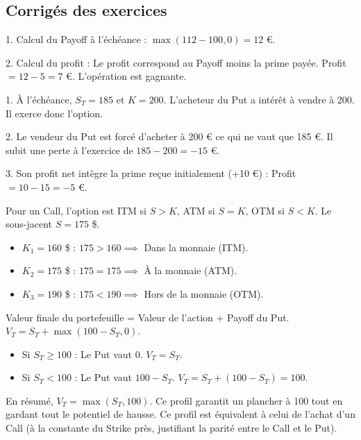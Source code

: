 \subsection{Corrigés des exercices}

\begin{correctionbox}
1. Calcul du Payoff à l'échéance : $\max(112 - 100, 0) = 12$ €.

2. Calcul du profit : Le profit correspond au Payoff moins la prime payée.
Profit $= 12 - 5 = 7$ €. L'opération est gagnante.
\end{correctionbox}

\begin{correctionbox}
1. À l'échéance, $S_T = 185$ et $K = 200$. L'acheteur du Put a intérêt à vendre à 200. Il exerce donc l'option.

2. Le vendeur du Put est forcé d'acheter à 200 € ce qui ne vaut que 185 €. Il subit une perte à l'exercice de $185 - 200 = -15$ €.

3. Son profit net intègre la prime reçue initialement (+10 €) : Profit $= 10 - 15 = -5$ €.
\end{correctionbox}

\begin{correctionbox}
Pour un Call, l'option est ITM si $S > K$, ATM si $S=K$, OTM si $S < K$.
Le sous-jacent $S = 175$ \$.
\begin{itemize}[label=$\cdot$]
    \item $K_1 = 160$ \$ : $175 > 160 \implies$ Dans la monnaie (ITM).
    \item $K_2 = 175$ \$ : $175 = 175 \implies$ À la monnaie (ATM).
    \item $K_3 = 190$ \$ : $175 < 190 \implies$ Hors de la monnaie (OTM).
\end{itemize}
\end{correctionbox}

\begin{correctionbox}
Valeur finale du portefeuille = Valeur de l'action + Payoff du Put.
$V_T = S_T + \max(100 - S_T, 0)$.
\begin{itemize}[label=$\cdot$]
    \item Si $S_T \geq 100$ : Le Put vaut $0$. $V_T = S_T$.
    \item Si $S_T < 100$ : Le Put vaut $100 - S_T$. $V_T = S_T + (100 - S_T) = 100$.
\end{itemize}
En résumé, $V_T = \max(S_T, 100)$. Ce profil garantit un plancher à 100 tout en gardant tout le potentiel de hausse. Ce profil est équivalent à celui de l'achat d'un Call (à la constante du Strike près, justifiant la parité entre le Call et le Put).
\end{correctionbox}

